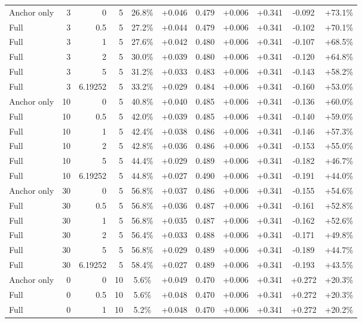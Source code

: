 \begin{table}[htbp]
\begin{tabular}{lrrrccccccc}
Anchor only & 3 & 0 & 5 & 26.8\% & +0.046 & 0.479 & +0.006 & +0.341 & -0.092 & +73.1\% \\
Full & 3 & 0.5 & 5 & 27.2\% & +0.044 & 0.479 & +0.006 & +0.341 & -0.102 & +70.1\% \\
Full & 3 & 1 & 5 & 27.6\% & +0.042 & 0.480 & +0.006 & +0.341 & -0.107 & +68.5\% \\
Full & 3 & 2 & 5 & 30.0\% & +0.039 & 0.480 & +0.006 & +0.341 & -0.120 & +64.8\% \\
Full & 3 & 5 & 5 & 31.2\% & +0.033 & 0.483 & +0.006 & +0.341 & -0.143 & +58.2\% \\
Full & 3 & 6.19252 & 5 & 33.2\% & +0.029 & 0.484 & +0.006 & +0.341 & -0.160 & +53.0\% \\
Anchor only & 10 & 0 & 5 & 40.8\% & +0.040 & 0.485 & +0.006 & +0.341 & -0.136 & +60.0\% \\
Full & 10 & 0.5 & 5 & 42.0\% & +0.039 & 0.485 & +0.006 & +0.341 & -0.140 & +59.0\% \\
Full & 10 & 1 & 5 & 42.4\% & +0.038 & 0.486 & +0.006 & +0.341 & -0.146 & +57.3\% \\
Full & 10 & 2 & 5 & 42.8\% & +0.036 & 0.486 & +0.006 & +0.341 & -0.153 & +55.0\% \\
Full & 10 & 5 & 5 & 44.4\% & +0.029 & 0.489 & +0.006 & +0.341 & -0.182 & +46.7\% \\
Full & 10 & 6.19252 & 5 & 44.8\% & +0.027 & 0.490 & +0.006 & +0.341 & -0.191 & +44.0\% \\
Anchor only & 30 & 0 & 5 & 56.8\% & +0.037 & 0.486 & +0.006 & +0.341 & -0.155 & +54.6\% \\
Full & 30 & 0.5 & 5 & 56.8\% & +0.036 & 0.487 & +0.006 & +0.341 & -0.161 & +52.8\% \\
Full & 30 & 1 & 5 & 56.8\% & +0.035 & 0.487 & +0.006 & +0.341 & -0.162 & +52.6\% \\
Full & 30 & 2 & 5 & 56.4\% & +0.033 & 0.488 & +0.006 & +0.341 & -0.171 & +49.8\% \\
Full & 30 & 5 & 5 & 56.8\% & +0.029 & 0.489 & +0.006 & +0.341 & -0.189 & +44.7\% \\
Full & 30 & 6.19252 & 5 & 58.4\% & +0.027 & 0.489 & +0.006 & +0.341 & -0.193 & +43.5\% \\
Anchor only & 0 & 0 & 10 & 5.6\% & +0.049 & 0.470 & +0.006 & +0.341 & +0.272 & +20.3\% \\
Full & 0 & 0.5 & 10 & 5.6\% & +0.048 & 0.470 & +0.006 & +0.341 & +0.272 & +20.3\% \\
Full & 0 & 1 & 10 & 5.2\% & +0.048 & 0.470 & +0.006 & +0.341 & +0.272 & +20.2\% \\

\end{tabular}
\end{table}
